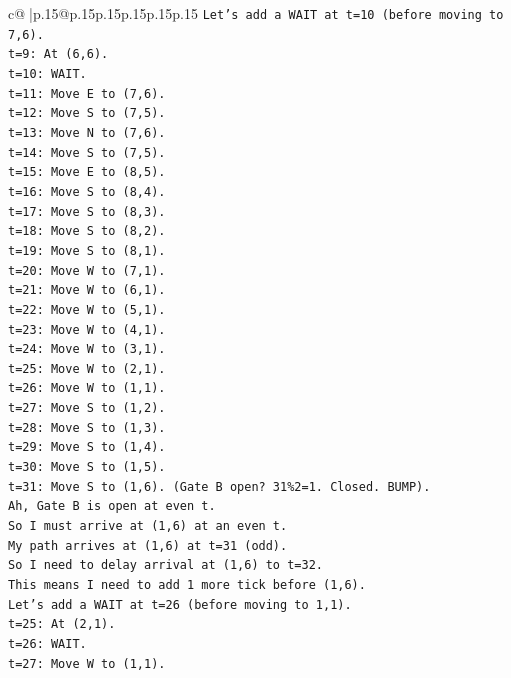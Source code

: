 \documentclass{article}
\begin{document}
{\begin{supertabular}{c@{$\;$}|p{.15\linewidth}@{}p{.15\linewidth}p{.15\linewidth}p{.15\linewidth}p{.15\linewidth}p{.15\linewidth}}
{{{\texttt{Let's add a WAIT at t=10 (before moving to 7,6).} \\
\texttt{t=9: At (6,6).} \\
\texttt{t=10: WAIT.} \\
\texttt{t=11: Move E to (7,6).} \\
\texttt{t=12: Move S to (7,5).} \\
\texttt{t=13: Move N to (7,6).} \\
\texttt{t=14: Move S to (7,5).} \\
\texttt{t=15: Move E to (8,5).} \\
\texttt{t=16: Move S to (8,4).} \\
\texttt{t=17: Move S to (8,3).} \\
\texttt{t=18: Move S to (8,2).} \\
\texttt{t=19: Move S to (8,1).} \\
\texttt{t=20: Move W to (7,1).} \\
\texttt{t=21: Move W to (6,1).} \\
\texttt{t=22: Move W to (5,1).} \\
\texttt{t=23: Move W to (4,1).} \\
\texttt{t=24: Move W to (3,1).} \\
\texttt{t=25: Move W to (2,1).} \\
\texttt{t=26: Move W to (1,1).} \\
\texttt{t=27: Move S to (1,2).} \\
\texttt{t=28: Move S to (1,3).} \\
\texttt{t=29: Move S to (1,4).} \\
\texttt{t=30: Move S to (1,5).} \\
\texttt{t=31: Move S to (1,6). (Gate B open? 31\%2=1. Closed. BUMP).} \\
\texttt{Ah, Gate B is open at even t.} \\
\texttt{So I must arrive at (1,6) at an even t.} \\
\texttt{My path arrives at (1,6) at t=31 (odd).} \\
\texttt{So I need to delay arrival at (1,6) to t=32.} \\
\texttt{This means I need to add 1 more tick before (1,6).} \\
\texttt{Let's add a WAIT at t=26 (before moving to 1,1).} \\
\texttt{t=25: At (2,1).} \\
\texttt{t=26: WAIT.} \\
\texttt{t=27: Move W to (1,1).} \\
}}}
\end{supertabular}}
\end{document}
